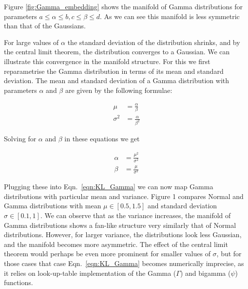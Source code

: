 Figure \ref{fig:Gamma_embedding} shows the manifold of Gamma distributions for parameters $a \leq \alpha \leq b, c\leq \beta \leq d$. As we can see this manifold is less symmetric than that of the Gaussians.

For large values of $\alpha$ the standard deviation of the distribution shrinks, and by the central limit theorem, the distribution converges to a Gaussian. We can illustrate this convergence in the manifold structure. For this we first reparametrise the Gamma distribution in terms of its mean and standard deviation. The mean and standard deviation of a Gamma distribution with parameters $\alpha$ and $\beta$ are given by the following formulae:

\begin{align}
	\mu &= \frac{\alpha}{\beta}\\
	\sigma^2 &= \frac{\alpha}{\beta^2}
\end{align}

Solving for $\alpha$ and $\beta$ in these equations we get

\begin{align}
	\alpha &= \frac{\mu^2}{\sigma^2}\\
	\beta &= \frac{\mu}{\sigma^2}
\end{align}

Plugging these into Eqn.\ \eqref{eqn:KL_Gamma} we can now map Gamma distributions with particular mean and variance. Figure 1 compares Normal and Gamma distributions with mean $\mu\in[0.5,1.5]$ and standard deviation $\sigma\in[0.1,1]$. We can observe that as the variance increases, the manifold of Gamma distributions shows a fan-like structure very similarly that of Normal distributions. However, for larger variance, the distributions look less Gaussian, and the manifold becomes more asymmetric. The effect of the central limit theorem would perhaps be even more prominent for smaller values of $\sigma$, but for those cases that case Eqn.\ \eqref{eqn:KL_Gamma} becomes numerically imprecise, as it relies on look-up-table implementation of the Gamma ($\Gamma$) and bigamma ($\psi$) functions.




